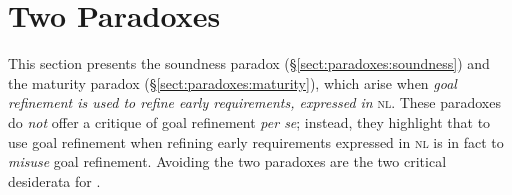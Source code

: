 \documentclass[10pt, conference, compsocconf]{IEEEtran}
\begin{document}
\section{Two Paradoxes}\label{sect:paradoxes}
This section presents the soundness paradox (\S\ref{sect:paradoxes:soundness}) and the maturity paradox (\S\ref{sect:paradoxes:maturity}), which arise when \textit{goal refinement is used to refine early requirements, expressed in} \textsc{nl}. These paradoxes do \textit{not} offer a critique of goal refinement \textit{per se}; instead, they highlight that to use goal refinement when refining early requirements expressed in \textsc{nl} is in fact to \textit{misuse} goal refinement. Avoiding the two paradoxes are the two critical desiderata for \nlref.

%
\end{document}
